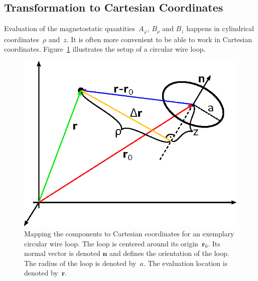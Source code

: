\subsection{Transformation to Cartesian Coordinates}
Evaluation of the magnetostatic quantities~$A_\varphi$, $B_\rho$ and $B_z$ happens in cylindrical coordinates~$\rho$ and~$z$.
It is often more convenient to be able to work in Cartesian coordinates.
Figure~\ref{fig:mappingToCartesian} illustrates the setup of a circular wire loop.
\begin{figure}[htbp]
 \centering
 \includegraphics{img/MappingToCartesian.eps}
 \caption{Mapping the components to Cartesian coordinates for an exemplary circular wire loop.
          The loop is centered around its origin~$\mathbf{r}_0$.
          Its normal vector is denoted $\mathbf{n}$ and defines the orientation of the loop.
          The radius of the loop is denoted by~$a$.
          The evaluation location is denoted by~$\mathbf{r}$.}
 \label{fig:mappingToCartesian}
\end{figure}

